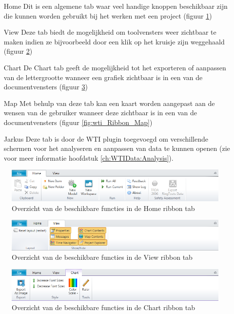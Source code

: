 \begin{itemize}
	\item[Home] Dit is een algemene tab waar veel handige knoppen beschikbaar zijn die kunnen worden gebruikt bij het werken met een project (figuur \ref{fig:wti_Ribbon_Home})
	\item[View] Deze tab biedt de mogelijkheid om toolvensters weer zichtbaar te maken indien ze bijvoorbeeld door een klik op het kruisje zijn weggehaald (figuur \ref{fig:wti_Ribbon_View})
	\item[Chart] De Chart tab geeft de mogelijkheid tot het exporteren of aanpassen van de lettergrootte wanneer een grafiek zichtbaar is in een van de documentvensters (figuur \ref{fig:wti_Ribbon_Chart})
	\item[Map] Met behulp van deze tab kan een kaart worden aangepast aan de wensen van de gebruiker wanneer deze zichtbaar is in een van de documentvensters (figuur \ref{fig:wti_Ribbon_Map})
	\item[Jarkus] Deze tab is door de WTI plugin toegevoegd om verschillende schermen voor het analyseren en aanpassen van data te kunnen openen (zie voor meer informatie hoofdstuk \ref{ch:WTIData:Analysis}). 
\end{itemize}

\begin{figure}[H]
	\centering
		\includegraphics[width=1.0\textwidth]{figures/chapter_general/wti_Home.png}
		\caption{Overzicht van de beschikbare functies in de Home ribbon tab}
	\label{fig:wti_Ribbon_Home}
\end{figure}

\begin{figure}[H]
	\centering
		\includegraphics[width=1.0\textwidth]{figures/chapter_general/wti_View.png}
		\caption{Overzicht van de beschikbare functies in de View ribbon tab}
	\label{fig:wti_Ribbon_View}
\end{figure}

\begin{figure}[H]
	\centering
		\includegraphics[width=1.0\textwidth]{figures/chapter_general/wti_Chart.png}
		\caption{Overzicht van de beschikbare functies in de Chart ribbon tab}
	\label{fig:wti_Ribbon_Chart}
\end{figure}

